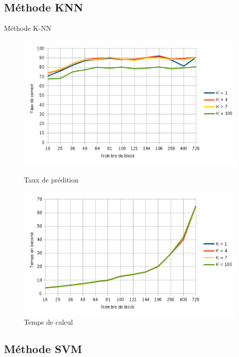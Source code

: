 \documentclass[12pt]{beamer}
\begin{document}
\subsection{Méthode KNN}
\begin{frame}{Méthode K-NN}
\begin{figure}[!htb]
  \includegraphics[width=\linewidth]{images/graphique.png}
  \caption{Taux de prédition}\label{fig:awesome_image2}
\endminipage\hfill
{}
  \includegraphics[width=\linewidth]{images/graphique1.png}
  \caption{Temps de calcul}\label{fig:awesome_image3}
\endminipage\hfill
\end{figure}
\end{frame}

\subsection{Méthode SVM}
\end{document}
